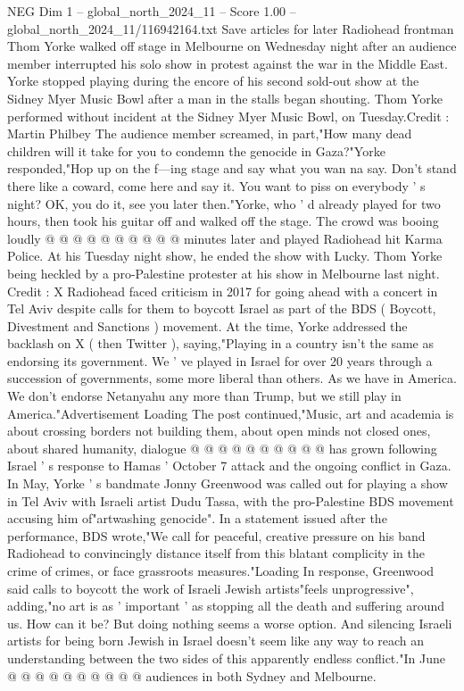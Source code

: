 \begin{textsample}{NEG Dim 1 – global\_north\_2024\_11 – Score 1.00 – global\_north\_2024\_11/116942164.txt}  \label{ex:f1_neg_111}
Save articles for later Radiohead frontman Thom Yorke walked off stage in Melbourne on Wednesday night after an audience member interrupted his solo show in protest against the war in the Middle East.
Yorke stopped playing during the encore of his second sold-out show at the Sidney Myer Music Bowl after a man in the stalls began shouting.
Thom Yorke performed without incident at the Sidney Myer Music Bowl, on Tuesday.Credit : Martin Philbey The audience member screamed, in part,"How many dead children will it take for you to condemn the genocide in Gaza?"Yorke responded,"Hop up on the f---ing stage and say what you wan na say.
Don't stand there like a coward, come here and say it.
You want to piss on everybody ' s night?
OK, you do it, see you later then."Yorke, who ' d already played for two hours, then took his guitar off and walked off the stage.
The crowd was booing loudly @ @ @ @ @ @ @ @ @ @ minutes later and played Radiohead hit Karma Police.
At his Tuesday night show, he ended the show with Lucky.
Thom Yorke being heckled by a pro-Palestine protester at his show in Melbourne last night.
Credit : X Radiohead faced criticism in 2017 for going ahead with a concert in Tel Aviv despite calls for them to boycott Israel as part of the BDS ( Boycott, Divestment and Sanctions ) movement.
At the time, Yorke addressed the backlash on X ( then Twitter ), saying,"Playing in a country isn't the same as endorsing its government.
We ' ve played in Israel for over 20 years through a succession of governments, some more liberal than others.
As we have in America.
We don't endorse Netanyahu any more than Trump, but we still play in America."Advertisement Loading The post continued,"Music, art and academia is about crossing borders not building them, about open minds not closed ones, about shared humanity, dialogue @ @ @ @ @ @ @ @ @ @ has grown following Israel ' s response to Hamas ' October 7 attack and the ongoing conflict in Gaza.
In May, Yorke ' s bandmate Jonny Greenwood was called out for playing a show in Tel Aviv with Israeli artist Dudu Tassa, with the pro-Palestine BDS movement accusing him of"artwashing genocide".
In a statement issued after the performance, BDS wrote,"We call for peaceful, creative pressure on his band Radiohead to convincingly distance itself from this blatant complicity in the crime of crimes, or face grassroots measures."Loading In response, Greenwood said calls to boycott the work of Israeli Jewish artists"feels unprogressive", adding,"no art is as ' important ' as stopping all the death and suffering around us.
How can it be?
But doing nothing seems a worse option.
And silencing Israeli artists for being born Jewish in Israel doesn't seem like any way to reach an understanding between the two sides of this apparently endless conflict."In June @ @ @ @ @ @ @ @ @ @ audiences in both Sydney and Melbourne.

\end{textsample}

